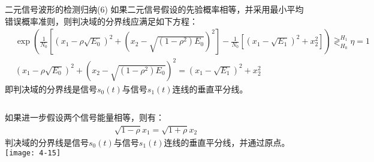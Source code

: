 \begin{frame}[shrink]{二元信号波形的检测归纳(6)}
如果二元信号假设的先验概率相等，并采用最小平均错误概率准则，则判决域的分界线应满足如下方程：
\begin{align*}
&\exp\left(
\frac{1}{N_0}\left[\left(x_1-\rho\sqrt{E_0}\right)^2+
\left(x_2-\sqrt{(1-\rho^2)E_0}\right)^2\right]-
\frac{1}{N_0}\left[\left(x_1-\sqrt{E_1}\right)^2+x_2^2\right]
\right)\mathop{\gtrless}_{H_0}^{H_1}\eta=1\\
&\left(x_1-\rho\sqrt{E_0}\right)^2+
\left(x_2-\sqrt{(1-\rho^2)E_0}\right)^2=\left(x_1-\sqrt{E_1}\right)^2+x_2^2
\end{align*}
即判决域的分界线是信号$s_0(t)$与信号$s_1(t)$连线的垂直平分线。
\begin{columns}%
	如果进一步假设两个信号能量相等，则有：
	\begin{align*}
	\sqrt{1-\rho}x_1=\sqrt{1+\rho}x_2
	\end{align*}
	判决域的分界线是信号$s_0(t)$与信号$s_1(t)$连线的垂直平分线，并通过原点。
	\texttt{[image: 4-15]}
\end{columns}
~\\
\end{frame}



